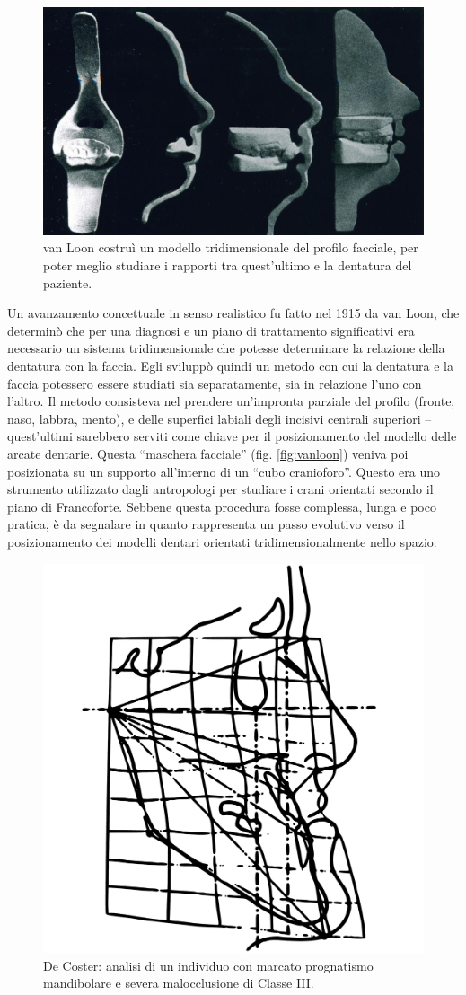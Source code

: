 \begin{figure}
\centering
\includegraphics[width=.7\textwidth]{./images/vanloon.jpg}
\caption{van Loon costruì un modello tridimensionale del profilo facciale, per poter meglio studiare i rapporti tra quest'ultimo e la dentatura del paziente.}
\label{fig:vanloon}
\end{figure}

Un avanzamento concettuale in senso realistico fu fatto nel 1915 da van Loon, che determinò che per una diagnosi e un piano di trattamento significativi era necessario un sistema tridimensionale che potesse determinare la relazione della dentatura con la faccia. Egli sviluppò quindi un metodo con cui la dentatura e la faccia potessero essere studiati sia separatamente, sia in relazione l'uno con l'altro. Il metodo consisteva nel prendere un'impronta parziale del profilo (fronte, naso, labbra, mento), e delle superfici labiali degli incisivi centrali superiori -- quest'ultimi sarebbero serviti come chiave per il posizionamento del modello delle arcate dentarie. Questa ``maschera facciale'' (fig. \vref{fig:vanloon}) veniva poi posizionata su un supporto all'interno di un ``cubo cranioforo''. Questo era uno strumento utilizzato dagli antropologi per studiare i crani orientati secondo il piano di Francoforte. Sebbene questa procedura fosse complessa, lunga e poco pratica, è da segnalare in quanto rappresenta un passo evolutivo verso il posizionamento dei modelli dentari orientati tridimensionalmente nello spazio.

\begin{figure}
\centering
\includegraphics[width=.5\textwidth]{./images/decoster.pdf}
\caption{De Coster: analisi di un individuo con marcato prognatismo mandibolare e severa malocclusione di Classe III.}
\label{fig:decoster}
\end{figure}

